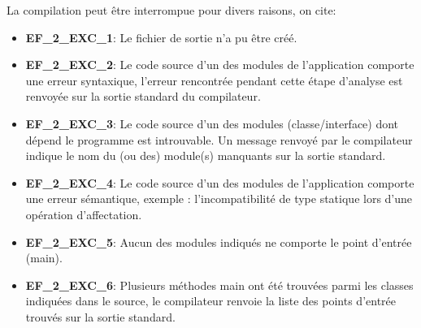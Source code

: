 {} %
{
La compilation peut être interrompue pour divers raisons, on cite:

	\begin{itemize}
  	\item \textbf {EF\_2\_EXC\_1}: Le fichier de sortie n'a pu être créé.
  	\item  \textbf {EF\_2\_EXC\_2}: Le code source d'un des modules de l'application comporte une erreur syntaxique, l'erreur rencontrée pendant cette étape d'analyse est renvoyée sur la sortie standard du compilateur.
  	\item \textbf {EF\_2\_EXC\_3}: Le code source d'un des modules (classe/interface) dont dépend le programme est introuvable. Un message renvoyé par le compilateur indique le nom du (ou des) module(s) manquants sur la sortie standard.
  	\item \textbf {EF\_2\_EXC\_4}: Le code source d'un des modules de l'application comporte une erreur sémantique, exemple : l'incompatibilité de type statique lors d'une opération d'affectation.
  	\item \textbf {EF\_2\_EXC\_5}: Aucun des modules indiqués ne comporte le point d'entrée (main).
  	\item \textbf {EF\_2\_EXC\_6}: Plusieurs méthodes main ont été trouvées parmi les classes indiquées dans le source, le compilateur renvoie la liste des points d'entrée trouvés sur la sortie standard.
  	\end {itemize}
 } %






